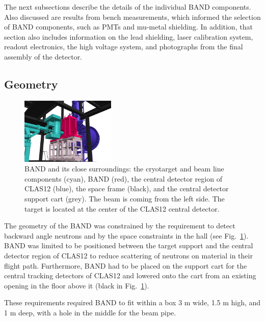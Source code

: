 \documentclass[3p,final,twocolumn]{elsarticle}
\begin{document}
The next subsections describe the details of the individual BAND components.
Also discussed are results from bench measurements, which informed the selection of
BAND components, such as PMTs and mu-metal shielding. In addition,
that section also includes information on the lead shielding, laser
calibration system, readout electronics, the high voltage system, and
 photographs from the final assembly of the detector.


\subsection{Geometry}
\begin{figure}[tb]
	\centering
		\includegraphics[width=0.40\textwidth]{FULL_CONTEXT_STUDIE_3.png}
		\vspace{0.5cm}
	    \caption{BAND and its close surroundings: the
                  cryotarget and beam line components (cyan),  BAND
                  (red), the central detector region of CLAS12
                  (blue), the space frame (black), and the central detector support cart (grey). The beam is coming from the left side. The
                  target is located at the center of the CLAS12 central detector.}
		\label{fig:bandtarget}
		
\end{figure}

The geometry of the BAND was constrained by the requirement to detect
backward angle neutrons and by the space constraints in the hall (see 
Fig.~\ref{fig:bandtarget}). BAND was limited to be positioned between the
target support and the central detector region of CLAS12 to reduce
scattering of neutrons on material in their flight path. Furthermore,
BAND had to be placed on the support cart for the central tracking
detectors of CLAS12 and lowered
onto the cart from an existing opening in the floor above it (black in Fig.~\ref{fig:bandtarget}).

These requirements required BAND to fit within a
box 3 \si{\meter} wide, 1.5 \si{\meter} high, and 1 \si{\meter}
deep, with a hole in the middle for the beam pipe.
\end{document}
